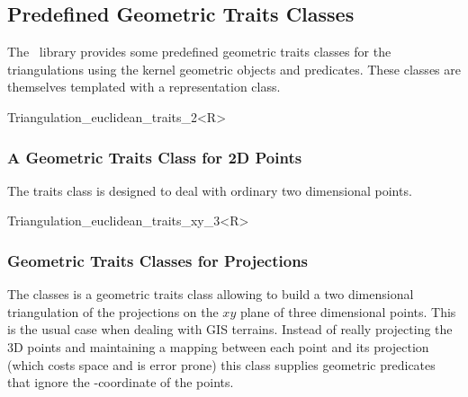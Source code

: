 \subsection{Predefined Geometric Traits Classes}

The \cgal\  library provides some predefined geometric traits classes
for the triangulations using the kernel geometric objects and predicates.
These classes are themselves templated with a representation class.



\begin{ccClassTemplate} {Triangulation_euclidean_traits_2<R>}
\subsubsection{A Geometric Traits Class for 2D Points}
The traits class 
is designed to deal with ordinary  two dimensional points.


\ccTypes
{}

\ccGlue
{}
\ccGlue
{}
\ccGlue
\end{ccClassTemplate}


\begin{ccClassTemplate} {Triangulation_euclidean_traits_xy_3<R>}
\subsubsection{Geometric Traits Classes for Projections}
The classes  
is a geometric traits class allowing to
build a two dimensional triangulation of the projections
on the $xy$ plane  of three dimensional points.
This is the usual case when dealing with GIS terrains.
Instead of really projecting the 3D points and
maintaining a mapping between each point and its projection
 (which costs space and is error prone)
this class supplies geometric predicates that ignore the
-coordinate of the points.


\ccTypes

\ccGlue
{}
\ccGlue
{}
\end{ccClassTemplate}

